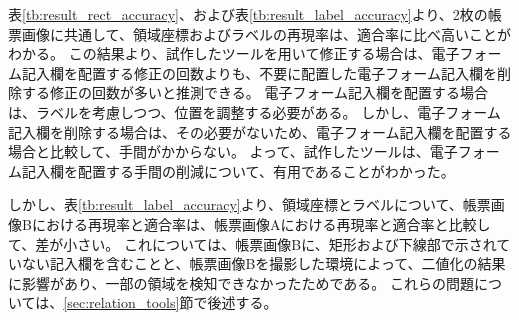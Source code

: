 表\ref{tb:result_rect_accuracy}、および表\ref{tb:result_label_accuracy}より、2枚の帳票画像に共通して、領域座標およびラベルの再現率は、適合率に比べ高いことがわかる。
この結果より、試作したツールを用いて修正する場合は、電子フォーム記入欄を配置する修正の回数よりも、不要に配置した電子フォーム記入欄を削除する修正の回数が多いと推測できる。
電子フォーム記入欄を配置する場合は、ラベルを考慮しつつ、位置を調整する必要がある。
しかし、電子フォーム記入欄を削除する場合は、その必要がないため、電子フォーム記入欄を配置する場合と比較して、手間がかからない。
よって、試作したツールは、電子フォーム記入欄を配置する手間の削減について、有用であることがわかった。

しかし、表\ref{tb:result_label_accuracy}より、領域座標とラベルについて、帳票画像Bにおける再現率と適合率は、帳票画像Aにおける再現率と適合率と比較して、差が小さい。
これについては、帳票画像Bに、矩形および下線部で示されていない記入欄を含むことと、帳票画像Bを撮影した環境によって、二値化の結果に影響があり、一部の領域を検知できなかったためである。
これらの問題については、\ref{sec:relation_tools}節で後述する。








